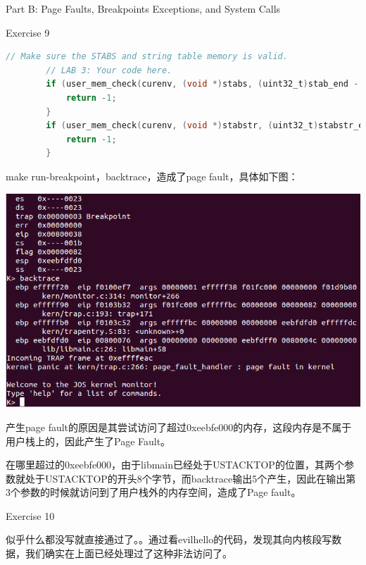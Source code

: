 \documentclass[GBK,winfonts,a4paper,10pt]{ctexart}
\begin{document}
\begin{section}{ Part B: Page Faults, Breakpoints Exceptions, and System Calls }
\begin{subsection}{ Exercise 9 }
\begin{lstlisting}[language=C]
		// Make sure the STABS and string table memory is valid.
		// LAB 3: Your code here.
		if (user_mem_check(curenv, (void *)stabs, (uint32_t)stab_end - (uint32_t)stabs, PTE_U) < 0) {
			return -1;
		}
		if (user_mem_check(curenv, (void *)stabstr, (uint32_t)stabstr_end - (uint32_t)stabstr, PTE_U) < 0) {
			return -1;
		}
\end{lstlisting}
\par
make run-breakpoint，backtrace，造成了page fault，具体如下图：
\par
\includegraphics[scale=0.5]{backtrace.png}
\par
产生page fault的原因是其尝试访问了超过0xeebfe000的内存，这段内存是不属于用户栈上的，因此产生了Page Fault。
\par
在哪里超过的0xeebfe000，由于libmain已经处于USTACKTOP的位置，其两个参数就处于USTACKTOP的开头8个字节，而backtrace输出5个产生，因此在输出第3个参数的时候就访问到了用户栈外的内存空间，造成了Page fault。
\end{subsection}

\begin{subsection}{ Exercise 10 }
\par
似乎什么都没写就直接通过了。。通过看evilhello的代码，发现其向内核段写数据，我们确实在上面已经处理过了这种非法访问了。
\end{subsection}


\end{section}
\end{document}
